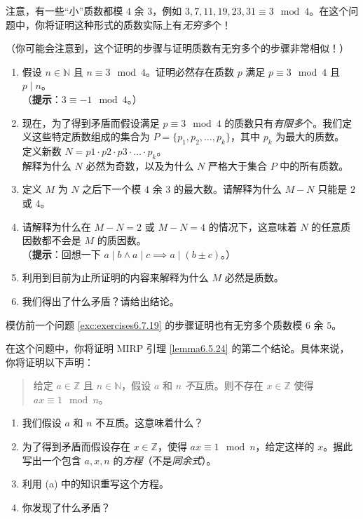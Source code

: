 \begin{exercise}\label{exc:exercises6.7.19}
    注意，有一些``小''质数都模 $4$ 余 $3$，例如 $3, 7, 11, 19, 23, 31 \equiv 3 \mod 4$。在这个问题中，你将证明这种形式的质数实际上有\emph{无穷多}个！

    （你可能会注意到，这个证明的步骤与证明质数有无穷多个的步骤非常相似！）
    \begin{enumerate}[label=(\alph*)]
        \item 假设 $n \in \mathbb{N}$ 且 $n \equiv 3 \mod 4$。证明必然存在质数 $p$ 满足 $p \equiv 3 \mod 4$ 且 $p \mid n$。\\
        （\textbf{提示}：$3 \equiv -1 \mod 4$。）
        \item 现在，为了得到矛盾而假设满足 $p \equiv 3 \mod 4$ 的质数只有\emph{有限多}个。我们定义这些特定质数组成的集合为 $P = \{p_1, p_2, \dots, p_k\}$，其中 $p_k$ 为最大的质数。\\
        定义新数 $N = p1 \cdot p2 \cdot p3 \cdot \dots \cdot p_k$。\\
        解释为什么 $N$ 必然为奇数，以及为什么 $N$ 严格大于集合 $P$ 中的所有质数。
        \item 定义 $M$ 为 $N$ 之后下一个模 $4$ 余 $3$ 的最大数。请解释为什么 $M - N$ 只能是 $2$ 或 $4$。
        \item 请解释为什么在 $M - N = 2$ 或 $M - N = 4$ 的情况下，这意味着 $N$ 的任意质因数都不会是 $M$ 的质因数。\\
        （\textbf{提示}：回想一下 $a \mid b \land a \mid c \implies a \mid (b \pm c)$。）
        \item 利用到目前为止所证明的内容来解释为什么 $M$ 必然是质数。
        \item 我们得出了什么矛盾？请给出结论。
    \end{enumerate}
\end{exercise}

\begin{exercise}
    模仿前一个问题 \ref{exc:exercises6.7.19} 的步骤证明也有无穷多个质数模 $6$ 余 $5$。
\end{exercise}

\begin{exercise}\label{exc:exercises6.7.21}
    在这个问题中，你将证明 MIRP 引理 \ref{lemma6.5.24} 的第二个结论。具体来说，你将证明以下声明：
    \begin{quote}
        给定 $a \in \mathbb{Z}$ 且 $n \in \mathbb{N}$，假设 $a$ 和 $n$ \emph{不}互质。则不存在 $x \in \mathbb{Z}$ 使得 $ax \equiv 1 \mod n$。
    \end{quote}
    \begin{enumerate}[label=(\alph*)]
        \item 我们假设 $a$ 和 $n$ 不互质。这意味着什么？
        \item 为了得到矛盾而假设存在 $x \in \mathbb{Z}$，使得 $ax \equiv 1 \mod n$，给定这样的 $x$。据此写出一个包含 $a,x,n$ 的\emph{方程}（不是\emph{同余式}）。
        \item 利用 (a) 中的知识重写这个方程。
        \item 你发现了什么矛盾？
    \end{enumerate}
\end{exercise}

